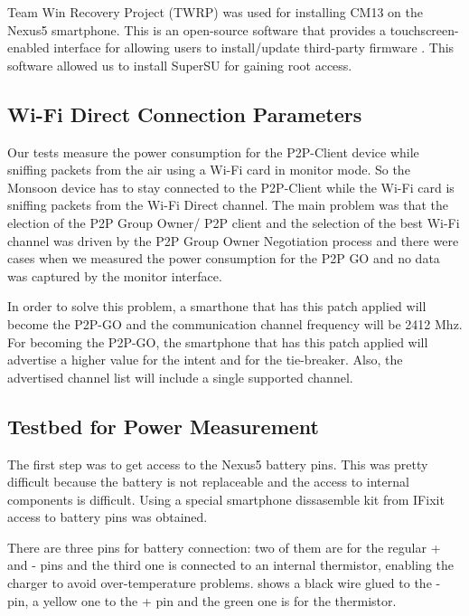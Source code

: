 Team Win Recovery Project (TWRP) was used for installing CM13 on the Nexus5 smartphone. This is an open-source software that provides a touchscreen-enabled interface for allowing users to install/update third-party firmware \cite{cite-twrp}. This software allowed us to install SuperSU for gaining root access.

\subsection{Wi-Fi Direct Connection Parameters}
\label{sub-sec:proj-scopep2pconnectionsectup}

Our tests measure the power consumption for the P2P-Client device while sniffing packets from the air using a Wi-Fi card in monitor mode. So the Monsoon device has to stay connected to the P2P-Client while the Wi-Fi card is sniffing packets from the Wi-Fi Direct channel. The main problem was that the election of the P2P Group Owner/ P2P client and the selection of the best Wi-Fi channel was driven by the P2P Group Owner Negotiation process and there were cases when we measured the power consumption for the P2P GO and no data was captured by the monitor interface.

In order to solve this problem, a smarthone that has this patch \cite{cite-p2ppatch} applied will become the P2P-GO and the communication channel frequency will be 2412 Mhz. For becoming the P2P-GO, the smartphone that has this patch applied will advertise a higher value for the intent and for the tie-breaker. Also, the advertised channel list will include a single supported channel.

\subsection{Testbed for Power Measurement}
\label{sub-sec:proj-scopepowertopology}

The first step was to get access to the Nexus5 battery pins. This was pretty difficult because the battery is not replaceable and the access to internal components is difficult. Using a special smartphone dissasemble kit from IFixit \cite{cite-ifixit} access to battery pins was obtained.

There are three pins for battery connection: two of them are for the regular + and - pins and the third one is connected to an internal thermistor, enabling the charger to avoid over-temperature problems.  shows a black wire glued to the - pin, a yellow one to the + pin and the green one is for the thermistor.

